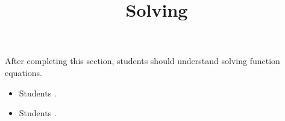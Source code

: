 \documentclass{ximera}
\title{Solving}
\begin{document}
\begin{abstract}
\end{abstract}

\maketitle

\begin{sectionOutcomes}

After completing this section, students should understand solving function equations. 

\begin{itemize}
\item Students .
\item Students .
\end{itemize}

\end{sectionOutcomes}
\end{document}
